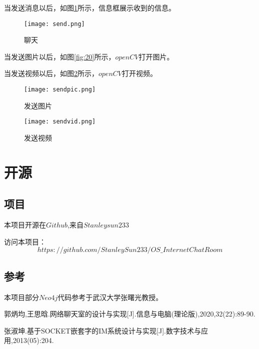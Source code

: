 \documentclass[forprint]{OSPaper}
\begin{document}
当发送消息以后，如图\ref{fig:19}所示，信息框展示收到的信息。

\begin{figure}[ht]
	\centering
	\texttt{[image: send.png]}
	\caption{聊天}
	\label{fig:19}
\end{figure}
\vspace*{2.5cm}
当发送图片以后，如图\ref{fig:20}所示，$openCV$打开图片。

当发送视频以后，如图\ref{fig:21}所示，$openCV$打开视频。

\begin{figure}[h]
	\begin{minipage}[t]{0.5\linewidth}
		\centering
		\label{fig:20}
		\texttt{[image: sendpic.png]}
		\caption{发送图片}
	\end{minipage}%
	\begin{minipage}[t]{0.5\linewidth}
		\centering
		\label{fig:21}
		\texttt{[image: sendvid.png]}
		\caption{发送视频}
	\end{minipage}%
\end{figure}

\chapter{开源}
\section{项目}
本项目开源在$Github$,来自$Stanleysun233$

访问本项目：
\begin{equation}
	https://github.com/StanleySun233/OS\_InternetChatRoom
\end{equation}
\section{参考}
本项目部分$Neo4j$代码参考于武汉大学张曙光教授。
\cleardoublepage{}
{}
\begin{thebibliography}{99}

   郭炳均,王思晗.网络聊天室的设计与实现[J].信息与电脑(理论版),2020,32(22):89-90.

   张淑坤.基于SOCKET嵌套字的IM系统设计与实现[J].数字技术与应用,2013(05):204.

\end{thebibliography}
\end{document}
